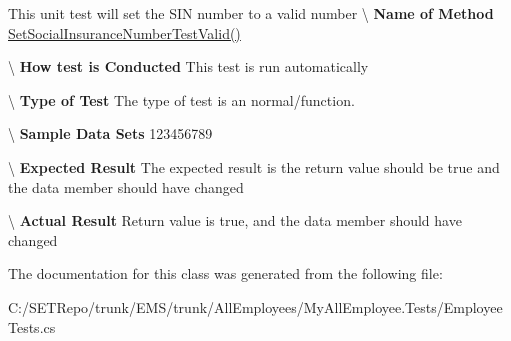 This unit test will set the S\+I\+N number to a valid number \textbackslash{} {\bfseries  Name of Method} \hyperlink{class_my_all_employee_1_1_tests_1_1_employee_tests_a3b5dae6ba3605c07bf85753fba24ce3e}{Set\+Social\+Insurance\+Number\+Test\+Valid()} 

\textbackslash{} {\bfseries  How test is Conducted} This test is run automatically

\textbackslash{} {\bfseries  Type of Test} The type of test is an normal/function.

\textbackslash{} {\bfseries  Sample Data Sets} 123456789

\textbackslash{} {\bfseries  Expected Result} The expected result is the return value should be true and the data member should have changed

\textbackslash{} {\bfseries  Actual Result} Return value is true, and the data member should have changed 

The documentation for this class was generated from the following file\+:\begin{DoxyCompactItemize}
\item 
C\+:/\+S\+E\+T\+Repo/trunk/\+E\+M\+S/trunk/\+All\+Employees/\+My\+All\+Employee.\+Tests/Employee\+Tests.\+cs\end{DoxyCompactItemize}
